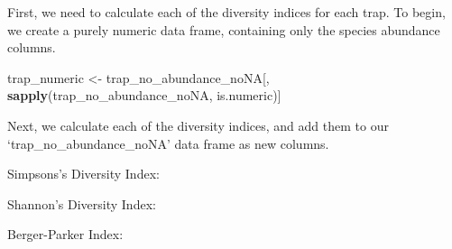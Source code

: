 \documentclass[
]{article}
\newenvironment{Shaded}{\begin{snugshade}}{\end{snugshade}}
\newcommand{\AttributeTok}[1]{\textcolor[rgb]{0.13,0.29,0.53}{#1}}
\newcommand{\ControlFlowTok}[1]{\textcolor[rgb]{0.13,0.29,0.53}{\textbf{#1}}}
\newcommand{\DecValTok}[1]{\textcolor[rgb]{0.00,0.00,0.81}{#1}}
\newcommand{\FunctionTok}[1]{\textcolor[rgb]{0.13,0.29,0.53}{\textbf{#1}}}
\newcommand{\NormalTok}[1]{#1}
\newcommand{\OtherTok}[1]{\textcolor[rgb]{0.56,0.35,0.01}{#1}}
\newcommand{\SpecialCharTok}[1]{\textcolor[rgb]{0.81,0.36,0.00}{\textbf{#1}}}
\newcommand{\StringTok}[1]{\textcolor[rgb]{0.31,0.60,0.02}{#1}}
\begin{document}
First, we need to calculate each of the diversity indices for each trap.
To begin, we create a purely numeric data frame, containing only the
species abundance columns.

\begin{Shaded}
\begin{Highlighting}[]
\NormalTok{trap\_numeric }\OtherTok{\textless{}{-}}\NormalTok{ trap\_no\_abundance\_noNA[, }\FunctionTok{sapply}\NormalTok{(trap\_no\_abundance\_noNA, is.numeric)]}
\end{Highlighting}
\end{Shaded}

Next, we calculate each of the diversity indices, and add them to our
`trap\_no\_abundance\_noNA' data frame as new columns.

Simpsons's Diversity Index:

\begin{Shaded}
\end{Shaded}

Shannon's Diversity Index:

\begin{Shaded}
\end{Shaded}

Berger-Parker Index:

\begin{Shaded}
\end{Shaded}
\end{document}

